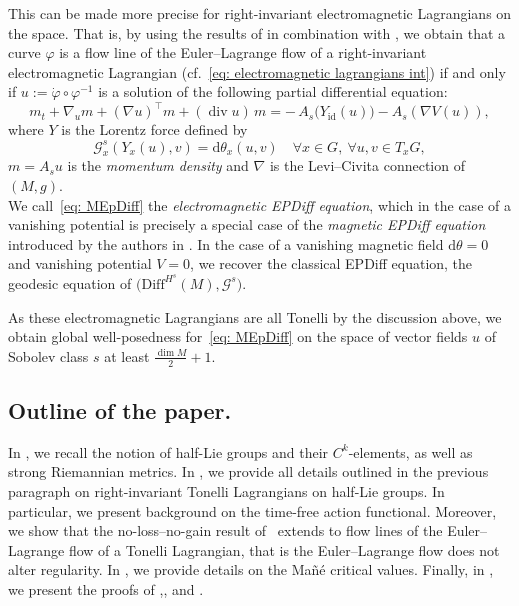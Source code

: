 \documentclass[11pt,reqno]{amsart}
\theoremstyle{plain}
\theoremstyle{definition}
\theoremstyle{plain} %
\theoremstyle{definition} %
\numberwithin{equation}{section}
\def\G{\mathcal{G}}
\def\d{\delta}
\def\d{\delta}
\def\d{{\mathrm{d}}}
\def\id{\mathrm{id}}
\begin{document}
This can be made more precise for right-invariant electromagnetic Lagrangians on the space.
That is, by using the results of \cite{Khesin-Mis-Mod-inf-Newton} in combination with \cite[Cor.~2.9, Thm.~2.10]{maier2025geometrichydrodynamicsinfinitedimensional}, 
we obtain that a curve \( \varphi \) is a flow line of the Euler--Lagrange flow of a right-invariant electromagnetic Lagrangian (cf.\ \eqref{eq: electromagnetic lagrangians int}) if and only if \( u := \dot{\varphi}\circ\varphi^{-1} \) is a solution of the following partial differential equation:
\begin{equation}\label{eq: MEpDiff}
    m_t + \nabla_u m + (\nabla u)^{\!\top} m + (\operatorname{div} u)\, m 
    = -\, A_s\big(Y_{\id}(u)\big) - A_s(\nabla V(u)), 
    \tag{ELMEpDiff}
\end{equation}
where \( Y \) is the Lorentz force defined by 
\[
\G^s_x(Y_x(u), v) = \d\theta_x(u, v) \quad \forall x \in G, \ \forall u, v \in T_x G,
\]
\( m = A_s u \) is the \emph{momentum density} 
and \( \nabla \) is the Levi–Civita connection of \( (M, g) \).\\

We call~\eqref{eq: MEpDiff} the \emph{electromagnetic EPDiff equation}, 
which in the case of a vanishing potential is precisely a special case of the \emph{magnetic EPDiff equation} introduced by the authors in \cite{HopfRinowHalfLiegroups}. 
In the case of a vanishing magnetic field \( \d\theta = 0 \) and vanishing potential \( V = 0 \), 
we recover the classical EPDiff equation, the geodesic equation of \( \big( \mathrm{Diff}^{H^s}(M), \G^s \big) \).

As these electromagnetic Lagrangians are all Tonelli by the discussion above,  
we obtain global well-posedness for~\eqref{eq: MEpDiff} on the space of vector fields \( u \) of Sobolev class $s$ at least \(\tfrac{\dim M}{2} + 1 \).
\subsection{Outline of the paper.}
In , we recall the notion of half-Lie groups and their \( C^k \)-elements, 
as well as strong Riemannian metrics.
In , we provide all details outlined in the previous paragraph 
on right-invariant Tonelli Lagrangians on half-Lie groups. 
In particular, we present background on the time-free action functional. 
Moreover, we show that the no-loss–no-gain result of~\cite{Bauer_2025} 
extends to flow lines of the Euler–Lagrange flow of a Tonelli Lagrangian, that is the Euler--Lagrange flow does not alter regularity.
In , we provide details on the Mañé critical values.
Finally, in , 
we present the proofs of ,, and .
\\
\end{document}
